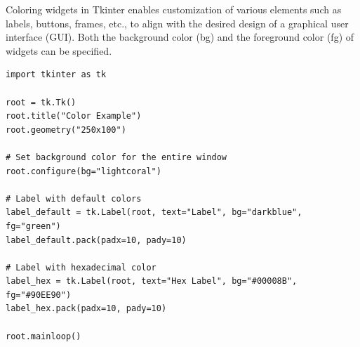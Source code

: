 Coloring widgets in Tkinter enables customization of various elements such as labels, buttons, frames, etc., to align with the desired design of a graphical user interface (GUI). Both the background color (bg) and the foreground color (fg) of widgets can be specified.

\begin{codebox}
\begin{verbatim}
import tkinter as tk

root = tk.Tk()
root.title("Color Example")
root.geometry("250x100")

# Set background color for the entire window
root.configure(bg="lightcoral")

# Label with default colors
label_default = tk.Label(root, text="Label", bg="darkblue", fg="green")
label_default.pack(padx=10, pady=10)

# Label with hexadecimal color
label_hex = tk.Label(root, text="Hex Label", bg="#00008B", fg="#90EE90")
label_hex.pack(padx=10, pady=10)

root.mainloop()
\end{verbatim}
\end{codebox}

